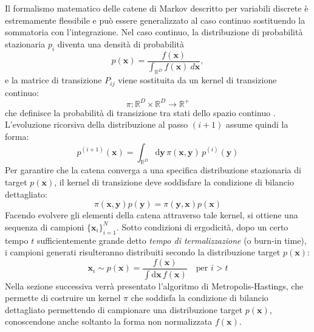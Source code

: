 Il formalismo matematico delle catene di Markov descritto per variabili discrete è estremamente flessibile e può essere generalizzato al caso continuo sostituendo la sommatoria con l'integrazione. Nel caso continuo, la distribuzione di probabilità stazionaria $p_i$ diventa una densità di probabilità 
\begin{equation}
p(\mathbf{x}) = \frac{f(\mathbf{x})}{\int_{\mathbb{R}^D}f(\mathbf{x})\ d \mathbf{x}},
\end{equation} e la matrice di transizione $P_{ij}$ viene sostituita da un kernel di transizione continuo:
\begin{equation}
    \pi \colon \mathbb{R}^D \times \mathbb{R}^D \to \mathbb{R}^+
\end{equation} che definisce la probabilità di transizione tra stati dello spazio continuo  \cite{leoni2023enhancing} \cite{Leoni2024}. L'evoluzione ricorsiva della distribuzione al passo $(i+1)$ assume quindi la forma:
\begin{equation}
p^{(i+1)}(\mathbf{x}) = \int_{\mathbb{R}^D} \mathrm{d}\mathbf{y} \, \pi(\mathbf{x}, \mathbf{y}) \, p^{(i)}(\mathbf{y})
\end{equation} Per garantire che la catena converga a una specifica distribuzione stazionaria di target $p(\mathbf{x})$, il kernel di transizione deve soddisfare la condizione di bilancio dettagliato:
\begin{equation}
\pi(\mathbf{x}, \mathbf{y}) p(\mathbf{y}) = \pi(\mathbf{y}, \mathbf{x}) p(\mathbf{x})
\end{equation} Facendo evolvere gli elementi della catena attraverso tale kernel, si ottiene una sequenza di campioni $\{\mathbf{x}_i\}_{i=1}^N$. Sotto condizioni di ergodicità, dopo un certo tempo $t$ sufficientemente grande detto \emph{tempo di termalizzazione} (o burn-in time), i campioni generati risulteranno distribuiti secondo la distribuzione target $p(\mathbf{x})$:
\begin{equation}
\mathbf{x}_i \sim p(\mathbf{x})= \frac{f(\mathbf{x})}{\int \mathrm{d}\mathbf{x} \, f(\mathbf{x})} \quad \text{per } i > t
\end{equation} Nella sezione successiva verrà presentato l'algoritmo di Metropolis-Hastings, che permette di costruire un kernel $\pi$ che soddisfa la condizione di bilancio dettagliato permettendo di campionare una distribuzione target $p(\mathbf{x})$,  conoscendone anche soltanto la forma non normalizzata $f(\mathbf{x})$.

